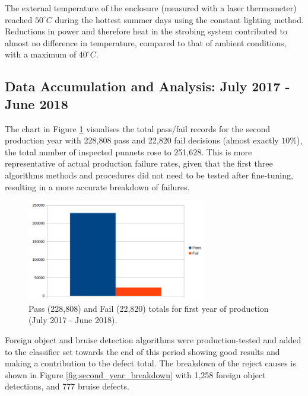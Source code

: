 \documentclass[fleqn,twoside,12pt]{report}
\begin{document}
The external temperature of the enclosure (measured with a laser thermometer) reached $50^{\circ}C$ during the hottest summer days using the constant lighting method. Reductions in power and therefore heat in the strobing system contributed to almost no difference in temperature, compared to that of ambient conditions, with a maximum of $40^{\circ}C$.



\subsection{Data Accumulation and Analysis: July 2017 - June 2018}

The chart in Figure \ref{fig:second_year} visualises the total pass/fail records for the second production year with 228,808 pass and 22,820 fail decisions (almost exactly $10\%$), the total number of inspected punnets rose to 251,628. This is more representative of actual production failure rates, given that the first three algorithms methods and procedures did not need to be tested after fine-tuning, resulting in a more accurate breakdown of failures. 



\begin{figure}[h]
	\centering
	\includegraphics[width=0.7\textwidth]{second_year.png}
	\caption{Pass (228,808) and Fail (22,820) totals for first year of production (July 2017 - June 2018).}
	\label{fig:second_year}
\end{figure}


Foreign object and bruise detection algorithms were production-tested and added to the classifier set towards the end of this period showing good results and making a contribution to the defect total. The breakdown of the reject causes is shown in Figure \ref{fig:second_year_breakdown} with 1,258 foreign object detections, and 777 bruise defects. 
\end{document}
